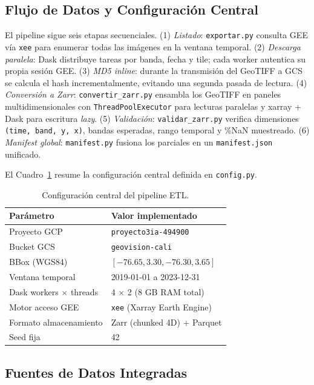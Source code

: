\documentclass[10pt,a4paper,twocolumn]{article}
\begin{document}
\subsection{Flujo de Datos y Configuración Central}

El pipeline sigue seis etapas secuenciales. (1) \textit{Listado}: \texttt{exportar.py} consulta GEE vía \texttt{xee} para enumerar todas las imágenes en la ventana temporal. (2) \textit{Descarga paralela}: Dask distribuye tareas por banda, fecha y tile; cada worker autentica su propia sesión GEE. (3) \textit{MD5 inline}: durante la transmisión del GeoTIFF a GCS se calcula el hash incrementalmente, evitando una segunda pasada de lectura. (4) \textit{Conversión a Zarr}: \texttt{convertir\_zarr.py} ensambla los GeoTIFF en paneles multidimensionales con \texttt{ThreadPoolExecutor} para lecturas paralelas y xarray + Dask para escritura \textit{lazy}. (5) \textit{Validación}: \texttt{validar\_zarr.py} verifica dimensiones \texttt{(time, band, y, x)}, bandas esperadas, rango temporal y \%NaN muestreado. (6) \textit{Manifest global}: \texttt{manifest.py} fusiona los parciales en un \texttt{manifest.json} unificado.

El Cuadro~\ref{tab:config} resume la configuración central definida en \texttt{config.py}.

\begin{table}[H]
  \centering
  \scriptsize
  \begin{tabular}{ll}
    \toprule
    \textbf{Parámetro} & \textbf{Valor implementado} \\
    \midrule
    Proyecto GCP & \texttt{proyecto3ia-494900} \\
    Bucket GCS & \texttt{geovision-cali} \\
    BBox (WGS84) & $[-76.65, 3.30, -76.30, 3.65]$ \\
    Ventana temporal & 2019-01-01 a 2023-12-31 \\
    Dask workers $\times$ threads & 4 $\times$ 2 (8 GB RAM total) \\
    Motor acceso GEE & \texttt{xee} (Xarray Earth Engine) \\
    Formato almacenamiento & Zarr (chunked 4D) + Parquet \\
    Seed fija & 42 \\
    \bottomrule
  \end{tabular}
  \caption{Configuración central del pipeline ETL.}
  \label{tab:config}
\end{table}

\subsection{Fuentes de Datos Integradas}
\end{document}
